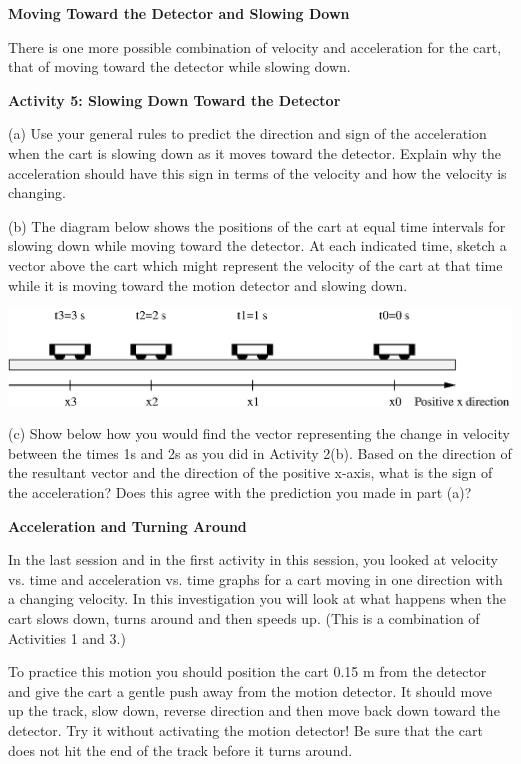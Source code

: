 \textbf{Moving Toward the Detector and Slowing Down }

There is one more possible combination of velocity and acceleration for the
cart, that of moving toward the detector while slowing down. 

\textbf{Activity 5: Slowing Down Toward the Detector} 

(a) Use your general rules to predict the direction and sign of the acceleration
when the cart is slowing down as it moves toward the detector. Explain why the
acceleration should have this sign in terms of the velocity and how the 
velocity is changing. 
\vspace{20mm}

(b) The diagram below shows the positions of the cart at equal time intervals
for slowing down while moving toward the detector. At each indicated time, 
sketch
a vector above the cart which might represent the velocity of the cart at that
time while it is moving toward the motion detector and slowing down.

\vspace{0.3cm}
{\par\centering \includegraphics{slowing/slowing_fig4.eps} \par}
\vspace{0.3cm}

(c) Show below how you would find the vector representing the change in velocity
between the times 1s and 2s as you did in Activity 2(b). Based on the 
direction of the resultant vector and the direction of the positive x-axis, 
what is the sign of the acceleration? 
Does this agree with the prediction you made in part (a)?
\vspace{15mm}

\textbf{Acceleration and Turning Around }

In the last session and in the first activity in this session, you looked at
velocity vs. time and acceleration vs. time graphs for a cart moving in one
direction with a changing velocity. In this investigation you will look at what
happens when the cart slows down, turns around and then speeds up. (This is a
combination of Activities 1 and 3.)

To practice this motion you should position the cart 0.15 m from the detector
and give the cart a gentle push away from the motion detector. It should move
up the track, slow down, reverse direction and then move back down toward the
detector. Try it without activating the motion detector! Be sure that the cart
does not hit the end of the track before it turns around. 

